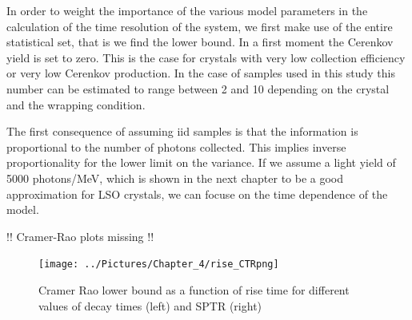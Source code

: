 In order to weight the importance of the various model parameters in the calculation of the time resolution of the system, we first make use of the entire statistical set, that is we find the lower bound.
In a first moment the Cerenkov yield is set to zero.
This is the case for crystals with very low collection efficiency or very low Cerenkov production. In the case of samples used in this study this number can be estimated to range between 2 and 10 depending on the crystal and the wrapping condition. 

The first consequence of assuming iid samples is that the information is proportional to the number of photons collected.
This implies inverse proportionality for the lower limit on the variance. If we assume a light yield of 5000 photons/MeV, which is shown in the next chapter to be a good approximation for LSO crystals, we can focuse on the time dependence of the model.

!! Cramer-Rao plots missing !!

\begin{figure}[htbp]
\begin{center}
\texttt{[image: ../Pictures/Chapter\_4/rise\_CTRpng]}
\end{center}
\caption[Cramer Rao evolution - rise time]{Cramer Rao lower bound as a function of rise time for different values of decay times (left) and SPTR (right)}
\label{fig:cramer_rise}
\end{figure}

